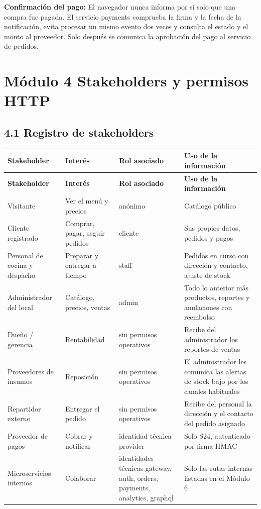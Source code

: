 \documentclass[10pt,letterpaper]{article}
\begin{document}
\textbf{Confirmación del pago:} El navegador nunca informa por sí solo que una compra fue pagada. El servicio payments comprueba la firma y la fecha de la notificación, evita procesar un mismo evento dos veces y consulta el estado y el monto al proveedor. Solo después se comunica la aprobación del pago al servicio de pedidos.


\section*{Módulo 4  Stakeholders y permisos HTTP}

\subsection*{4.1 Registro de stakeholders}
{\footnotesize
\begin{longtable}{|P{\tabcolsep\relax}|P{\tabcolsep\relax}|P{\tabcolsep\relax}|P{\tabcolsep\relax}|}
\hline
\textbf{Stakeholder} & \textbf{Interés} & \textbf{Rol asociado} & \textbf{Uso de la información} \\ \hline
\endfirsthead
\hline
\textbf{Stakeholder} & \textbf{Interés} & \textbf{Rol asociado} & \textbf{Uso de la información} \\ \hline
\endhead
Visitante & Ver el menú y precios & anónimo & Catálogo público \\ \hline
Cliente registrado & Comprar, pagar, seguir pedidos & cliente & Sus propios datos, pedidos y pagos \\ \hline
Personal de cocina y despacho & Preparar y entregar a tiempo & staff & Pedidos en curso con dirección y contacto, ajuste de stock \\ \hline
Administrador del local & Catálogo, precios, ventas & admin & Todo lo anterior más productos, reportes y anulaciones con reembolso \\ \hline
Dueño /\allowbreak{} gerencia & Rentabilidad & sin permisos operativos & Recibe del administrador los reportes de ventas \\ \hline
Proveedores de insumos & Reposición & sin permisos operativos & El administrador les comunica las alertas de stock bajo por los canales habituales \\ \hline
Repartidor externo & Entregar el pedido & sin permisos operativos & Recibe del personal la dirección y el contacto del pedido asignado \\ \hline
Proveedor de pagos & Cobrar y notificar & identidad técnica provider & Solo S24, autenticado por firma HMAC \\ \hline
Microservicios internos & Colaborar & identidades técnicas gateway, auth, orders, payments, analytics, graphql & Solo las rutas internas listadas en el Módulo 6 \\ \hline
\end{longtable}}
\end{document}
